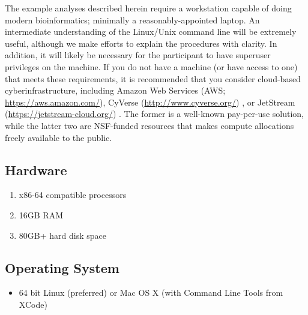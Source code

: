\documentclass[runningheads,a4paper]{llncs}
\begin{document}
\begin{linenumbers}
The example analyses described herein require a workstation capable of doing modern bioinformatics; minimally a reasonably-appointed laptop.
An intermediate understanding of the Linux/Unix command line will be extremely useful, although we make efforts to explain the procedures with clarity. 
In addition, it will likely be necessary for the participant to have superuser privileges on the machine.
If you do not have a machine (or have access to one) that meets these requirements, it is recommended that you consider cloud-based cyberinfrastructure, including Amazon Web Services (AWS; \url{https://aws.amazon.com/}), CyVerse (\url{http://www.cyverse.org/}) \cite{Merchant:2016jn}, or JetStream (\url{https://jetstream-cloud.org/}) \cite{Stewart:2015abc}.
The former is a well-known pay-per-use solution, while the latter two are NSF-funded resources that makes compute allocations freely available to the public.

\subsection{Hardware}
\begin{enumerate} 
\item x86-64 compatible processors
\item 16GB RAM
\item 80GB+ hard disk space
\end{enumerate}

\subsection{Operating System}
\begin{itemize}
\item 64 bit Linux (preferred) or Mac OS X (with Command Line Tools from XCode)
\end{itemize}


\end{linenumbers}
\end{document}
